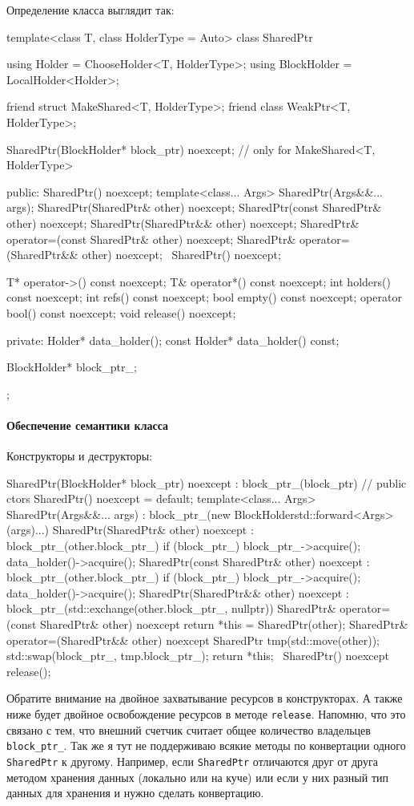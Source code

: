 Определение класса выглядит так:
\begin{cppcode}
template<class T, class HolderType = Auto>
class SharedPtr {
  using Holder = ChooseHolder<T, HolderType>;
  using BlockHolder = LocalHolder<Holder>;
  
  friend struct MakeShared<T, HolderType>;
  friend class WeakPtr<T, HolderType>;

  SharedPtr(BlockHolder* block_ptr) noexcept;  // only for MakeShared<T, HolderType>

public:
  SharedPtr() noexcept;
  template<class... Args>
  SharedPtr(Args&&... args);
  SharedPtr(SharedPtr& other) noexcept;
  SharedPtr(const SharedPtr& other) noexcept;
  SharedPtr(SharedPtr&& other) noexcept;
  SharedPtr& operator=(const SharedPtr& other) noexcept;
  SharedPtr& operator=(SharedPtr&& other) noexcept;
  ~SharedPtr() noexcept;

  T* operator->() const noexcept;
  T& operator*() const noexcept;
  int holders() const noexcept;
  int refs() const noexcept;
  bool empty() const noexcept;
  operator bool() const noexcept;
  void release() noexcept;

private:
  Holder* data_holder();
  const Holder* data_holder() const;

  BlockHolder* block_ptr_;
};
\end{cppcode}

\paragraph{Обеспечение семантики класса}

Конструкторы и деструкторы:
\begin{cppcode}
SharedPtr(BlockHolder* block_ptr) noexcept : block_ptr_(block_ptr) {
}
// public ctors
SharedPtr() noexcept = default;
template<class... Args>
SharedPtr(Args&&... args)
    : block_ptr_(new BlockHolder{std::forward<Args>(args)...}) {
}
SharedPtr(SharedPtr& other) noexcept : block_ptr_(other.block_ptr_) {
  if (block_ptr_) {
    block_ptr_->acquire();
    data_holder()->acquire();
  }
}
SharedPtr(const SharedPtr& other) noexcept : block_ptr_(other.block_ptr_) {
  if (block_ptr_) {
    block_ptr_->acquire();
    data_holder()->acquire();
  }
}
SharedPtr(SharedPtr&& other) noexcept
    : block_ptr_(std::exchange(other.block_ptr_, nullptr)) {
}
SharedPtr& operator=(const SharedPtr& other) noexcept {
  return *this = SharedPtr(other);
}
SharedPtr& operator=(SharedPtr&& other) noexcept {
  SharedPtr tmp(std::move(other));
  std::swap(block_ptr_, tmp.block_ptr_);
  return *this;
}
~SharedPtr() noexcept {
  release();
}
\end{cppcode}
Обратите внимание на двойное захватывание ресурсов в конструкторах.
А также ниже будет двойное освобождение ресурсов в методе \verb"release".
Напомню, что это связано с тем, что внешний счетчик считает общее количество владельцев \verb"block_ptr_".
Так же я тут не поддерживаю всякие методы по конвертации одного \verb"SharedPtr" к другому.
Например, если \verb"SharedPtr" отличаются друг от друга методом хранения данных (локально или на куче) или если у них разный тип данных для хранения и нужно сделать конвертацию.

